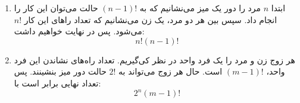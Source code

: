 \begin{enumerate}
  \item 
      ابتدا $n$ 
      مرد را دور یک میز می‌نشانیم که به 
      $(n-1)!$ حالت می‌توان این کار را انجام داد. سپس بین هر دو مرد، یک زن می‌نشانیم که تعداد را‌های این کار 
      $n!$ می‌شود. پس در نهایت خواهیم داشت:
        $$n!(n-1)!$$

  \item 
    هر زوج زن و مرد را یک فرد واحد در نظر کی‌گیریم. تعداد راه‌های نشاندن این فرد واحد، 
    $(m-1)!$ است. حال هر زوج می‌تواند به 
    $2!$ حالت دور میز بنشینند. پس تعداد نهایی برابر است با:
      $${2^n}(m-1)!$$
\end{enumerate}